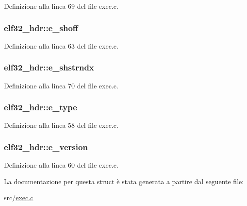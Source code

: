 Definizione alla linea 69 del file exec.\+c.

\hypertarget{structelf32__hdr_afd8ce4ec0f05960b2306f98625be6db0}{
\subsubsection[{e\+\_\+shoff}]{ elf32\+\_\+hdr\+::e\+\_\+shoff}}\label{structelf32__hdr_afd8ce4ec0f05960b2306f98625be6db0}


Definizione alla linea 63 del file exec.\+c.

\hypertarget{structelf32__hdr_afd7ed18333923147918975fdfa4ee99a}{
\subsubsection[{e\+\_\+shstrndx}]{ elf32\+\_\+hdr\+::e\+\_\+shstrndx}}\label{structelf32__hdr_afd7ed18333923147918975fdfa4ee99a}


Definizione alla linea 70 del file exec.\+c.

\hypertarget{structelf32__hdr_a01aab87d9a8f658d41a1162158c07878}{
\subsubsection[{e\+\_\+type}]{ elf32\+\_\+hdr\+::e\+\_\+type}}\label{structelf32__hdr_a01aab87d9a8f658d41a1162158c07878}


Definizione alla linea 58 del file exec.\+c.

\hypertarget{structelf32__hdr_a4324ae029dfd1967979b984a2f3e14e4}{
\subsubsection[{e\+\_\+version}]{ elf32\+\_\+hdr\+::e\+\_\+version}}\label{structelf32__hdr_a4324ae029dfd1967979b984a2f3e14e4}


Definizione alla linea 60 del file exec.\+c.



La documentazione per questa struct è stata generata a partire dal seguente file\+:\begin{DoxyCompactItemize}
\item 
src/\hyperlink{exec_8c}{exec.\+c}\end{DoxyCompactItemize}
